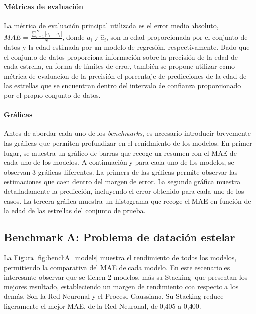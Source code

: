 \paragraph{Métricas de evaluación}
La métrica de evaluación principal utilizada es el error medio absoluto, $MAE = \frac{\sum_{i=1}^{N}|a_i-\hat{a}_i|}{N}$, donde $a_i$ y $\hat{a}_i$, son la edad proporcionada por el conjunto de datos y la edad estimada por un modelo de regresión, respectivamente. Dado que el conjunto de datos proporciona información sobre la precisión de la edad de cada estrella, en forma de límites de error, también se propone utilizar como métrica de evaluación de la precisión el porcentaje de predicciones de la edad de las estrellas que se encuentran dentro del intervalo de confianza proporcionado por el propio conjunto de datos.

\paragraph{Gráficas}
Antes de abordar cada uno de los \emph{benchmarks}, es necesario introducir brevemente las gráficas que permiten profundizar en el renidmiento de los modelos. En primer lugar, se muestra un gráfico de barras que recoge un resumen con el MAE de cada uno de los modelos. A continuación y para cada uno de los modelos, se observan 3 gráficas diferentes. La primera de las gráficas permite observar las estimaciones que caen dentro del margen de error. La segunda gráfica muestra detalladamente la predicción, incluyendo el error obtenido para cada uno de los casos. La tercera gráfica muestra un histograma que recoge el MAE en función de la edad de las estrellas del conjunto de prueba.

\subsection{Benchmark A: Problema de datación estelar}

La Figura \ref{fig:benchA_models} muestra el rendimiento de todos los modelos, permitiendo la comparativa del MAE de cada modelo. En este escenario es interesante observar que se tienen 2 modelos, más su Stacking, que presentan los mejores resultado, estableciendo un margen de rendimiento con respecto a los demás. Son la Red Neuronal y el Proceso Gaussiano. Su Stacking reduce ligeramente el mejor MAE, de la Red Neuronal, de 0,405 a 0,400.

